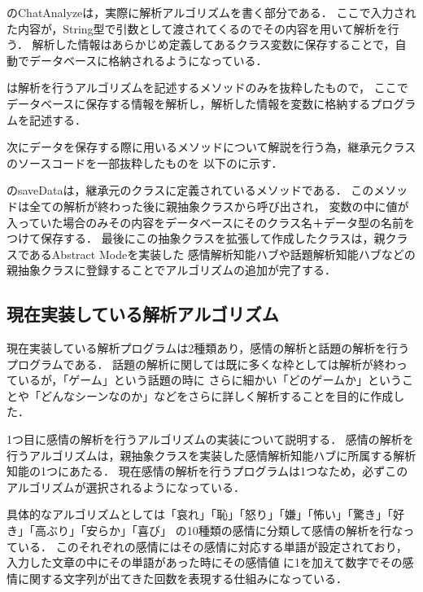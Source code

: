 のChatAnalyzeは，実際に解析アルゴリズムを書く部分である．
ここで入力された内容が，String型で引数として渡されてくるのでその内容を用いて解析を行う．
解析した情報はあらかじめ定義してあるクラス変数に保存することで，自動でデータベースに格納されるようになっている．


は解析を行うアルゴリズムを記述するメソッドのみを抜粋したもので，
ここでデータベースに保存する情報を解析し，解析した情報を変数に格納するプログラムを記述する．

次にデータを保存する際に用いるメソッドについて解説を行う為，継承元クラスのソースコードを一部抜粋したものを
以下のに示す．

のsaveDataは，継承元のクラスに定義されているメソッドである．
このメソッドは全ての解析が終わった後に親抽象クラスから呼び出され，
変数の中に値が入っていた場合のみその内容をデータベースにそのクラス名＋データ型の名前をつけて保存する．
最後にこの抽象クラスを拡張して作成したクラスは，親クラスであるAbstract Modeを実装した
感情解析知能ハブや話題解析知能ハブなどの親抽象クラスに登録することでアルゴリズムの追加が完了する．

\subsection{現在実装している解析アルゴリズム}
現在実装している解析プログラムは2種類あり，感情の解析と話題の解析を行うプログラムである．
話題の解析に関しては既に多くな枠としては解析が終わっているが，「ゲーム」という話題の時に
さらに細かい「どのゲームか」ということや「どんなシーンなのか」などをさらに詳しく解析することを目的に作成した．

1つ目に感情の解析を行うアルゴリズムの実装について説明する．
感情の解析を行うアルゴリズムは，親抽象クラスを実装した感情解析知能ハブに所属する解析知能の1つにあたる．
現在感情の解析を行うプログラムは1つなため，必ずこのアルゴリズムが選択されるようになっている．

具体的なアルゴリズムとしては「哀れ」「恥」「怒り」「嫌」「怖い」「驚き」「好き」「高ぶり」「安らか」「喜び」
の10種類の感情に分類して感情の解析を行なっている．
このそれぞれの感情にはその感情に対応する単語が設定されており，入力した文章の中にその単語があった時にその感情値
に1を加えて数字でその感情に関する文字列が出てきた回数を表現する仕組みになっている．

